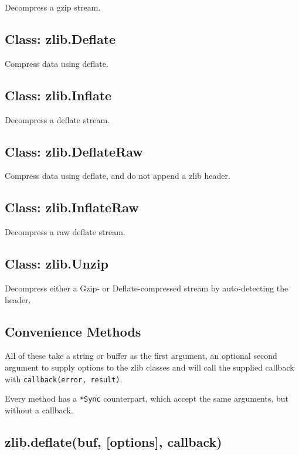 Decompress a gzip stream.

\subsection{Class: zlib.Deflate}\label{class-zlib.deflate}

Compress data using deflate.

\subsection{Class: zlib.Inflate}\label{class-zlib.inflate}

Decompress a deflate stream.

\subsection{Class: zlib.DeflateRaw}\label{class-zlib.deflateraw}

Compress data using deflate, and do not append a zlib header.

\subsection{Class: zlib.InflateRaw}\label{class-zlib.inflateraw}

Decompress a raw deflate stream.

\subsection{Class: zlib.Unzip}\label{class-zlib.unzip}

Decompress either a Gzip- or Deflate-compressed stream by auto-detecting
the header.

\subsection{Convenience Methods}\label{convenience-methods}

All of these take a string or buffer as the first argument, an optional
second argument to supply options to the zlib classes and will call the
supplied callback with \texttt{callback(error, result)}.

Every method has a \texttt{*Sync} counterpart, which accept the same
arguments, but without a callback.

\subsection{zlib.deflate(buf, {[}options{]},
callback)}\label{zlib.deflatebuf-options-callback}

